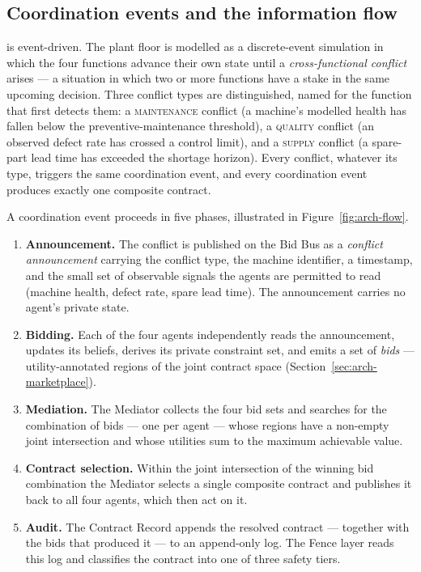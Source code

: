 \subsection{Coordination events and the information flow}
\label{subsec:info-flow}

\NEXUS{} is event-driven. The plant floor is modelled as a discrete-event
simulation in which the four functions advance their own state until a
\emph{cross-functional conflict} arises --- a situation in which two or
more functions have a stake in the same upcoming decision. Three
conflict types are distinguished, named for the function that first
detects them: a \textsc{maintenance} conflict (a machine's modelled
health has fallen below the preventive-maintenance threshold), a
\textsc{quality} conflict (an observed defect rate has crossed a control
limit), and a \textsc{supply} conflict (a spare-part lead time has
exceeded the shortage horizon). Every conflict, whatever its type,
triggers the same coordination event, and every coordination event
produces exactly one composite contract.

A coordination event proceeds in five phases, illustrated in
Figure~\ref{fig:arch-flow}.

\begin{enumerate}[leftmargin=1.8em,itemsep=0.25em]
  \item \textbf{Announcement.} The conflict is published on the Bid Bus
    as a \emph{conflict announcement} carrying the conflict type, the
    machine identifier, a timestamp, and the small set of observable
    signals the agents are permitted to read (machine health, defect
    rate, spare lead time). The announcement carries no agent's private
    state.
  \item \textbf{Bidding.} Each of the four agents independently reads
    the announcement, updates its beliefs, derives its private
    constraint set, and emits a set of \emph{bids} ---
    utility-annotated regions of the joint contract space
    (Section~\ref{sec:arch-marketplace}).
  \item \textbf{Mediation.} The Mediator collects the four bid sets and
    searches for the combination of bids --- one per agent --- whose
    regions have a non-empty joint intersection and whose utilities sum
    to the maximum achievable value.
  \item \textbf{Contract selection.} Within the joint intersection of
    the winning bid combination the Mediator selects a single composite
    contract and publishes it back to all four agents, which then act
    on it.
  \item \textbf{Audit.} The Contract Record appends the resolved
    contract --- together with the bids that produced it --- to an
    append-only log. The Fence layer reads this log and classifies the
    contract into one of three safety tiers.
\end{enumerate}

